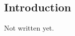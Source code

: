 


\begin{bibunit}

\chapter{Introduction}
\label{chap:intro}

Not written yet.


\renewcommand{\bibsection}{\section{\bibname}}
\putbib
\end{bibunit}
